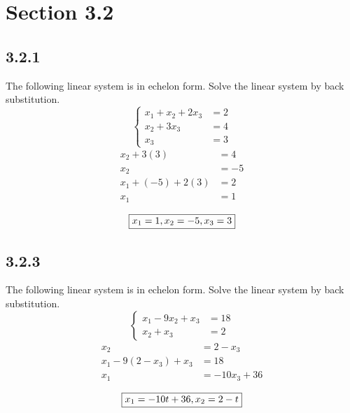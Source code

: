 \documentclass{article}
\begin{document}
\newcommand{\hr}{\par\noindent\rule{\textwidth}{0.4pt}}

\newcommand{\bc}[1]{
	\begin{equation*}
		\begin{boxed}
			{#1}
		\end{boxed}
	\end{equation*}
}

\newcommand{\cond}[2]{
	\ifmmode
		{#1} \quad {#2}
	\else
		$$ {#1} \quad {#2} $$
	\fi
}

\tableofcontents

\section{Section 3.2}

\subsection{3.2.1}
The following linear system is in echelon form. Solve the linear system by back substitution.
\begin{equation*}
	\left\{
		\begin{aligned}
			x_1 + x_2 + 2x_3 & = 2 \\
			x_2 + 3x_3 & = 4 \\
			x_3 & = 3
		\end{aligned}
	\right.
\end{equation*}
\begin{align*}
	x_2 + 3(3) & = 4 \\
	x_2 & = -5 \\
	x_1 + (-5) + 2(3) & = 2 \\
	x_1 & = 1
\end{align*}
\bc{x_1 = 1, x_2 = -5, x_3 = 3}

\subsection{3.2.3}
The following linear system is in echelon form. Solve the linear system by back substitution.
\begin{equation*}
	\left\{
		\begin{aligned}
			x_1 - 9x_2 + x_3 & = 18 \\
			x_2 + x_3 & = 2
		\end{aligned}
	\right.
\end{equation*}
\begin{align*}
	x_2 & = 2 - x_3 \\
	x_1 - 9(2 - x_3) + x_3 & = 18 \\
	x_1 & = -10x_3 + 36
\end{align*}
\bc{x_1 = -10t + 36, x_2 = 2 - t}
\end{document}
